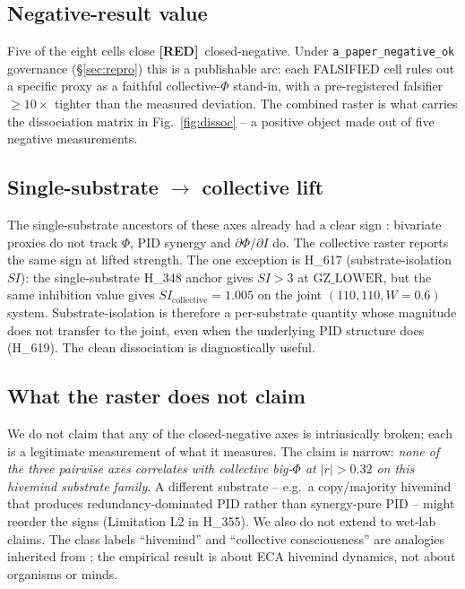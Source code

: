 \documentclass[11pt,a4paper]{article}
\providecommand{\tierRed}{\textbf{[RED]}}
\begin{document}
\subsection{Negative-result value}

Five of the eight cells close \tierRed\ closed-negative. Under
\texttt{a\_paper\_negative\_ok} governance (\S\ref{sec:repro}) this
is a publishable arc: each FALSIFIED cell rules out a specific
proxy as a faithful collective-$\Phi$ stand-in, with a
pre-registered falsifier $\geq 10\times$ tighter than the measured
deviation. The combined raster is what carries the dissociation
matrix in Fig.~\ref{fig:dissoc} -- a positive object made out of
five negative measurements.

\subsection{Single-substrate $\to$ collective lift}

The single-substrate ancestors of these axes already had a clear
sign \citep{anima_H207,anima_H290,anima_H293,anima_H294}: bivariate
proxies do not track $\Phi$, PID synergy and $\partial\Phi/\partial I$
do. The collective raster reports the same sign at lifted strength.
The one exception is H\_617 (substrate-isolation $SI$): the
single-substrate H\_348 anchor gives $SI > 3$ at $\mathrm{GZ\_LOWER}$,
but the same inhibition value gives
$SI_{\mathrm{collective}} = 1.005$ on the joint $(110,110,W{=}0.6)$
system. Substrate-isolation is therefore a per-substrate quantity
whose magnitude does not transfer to the joint, even when the
underlying PID structure does (H\_619). The clean dissociation is
diagnostically useful.

\subsection{What the raster does not claim}

We do not claim that any of the closed-negative axes is intrinsically
broken; each is a legitimate measurement of what it measures. The
claim is narrow: \emph{none of the three pairwise axes correlates
with collective big-$\Phi$ at $|r| > 0.32$ on this hivemind
substrate family}. A different substrate -- e.g.\ a copy/majority
hivemind that produces redundancy-dominated PID rather than
synergy-pure PID -- might reorder the signs (Limitation L2 in
H\_355). We also do not extend to wet-lab claims. The class
labels ``hivemind'' and ``collective consciousness'' are
analogies inherited from \citep{anima_H290,anima_H293}; the
empirical result is about ECA hivemind dynamics, not about
organisms or minds.
\end{document}
